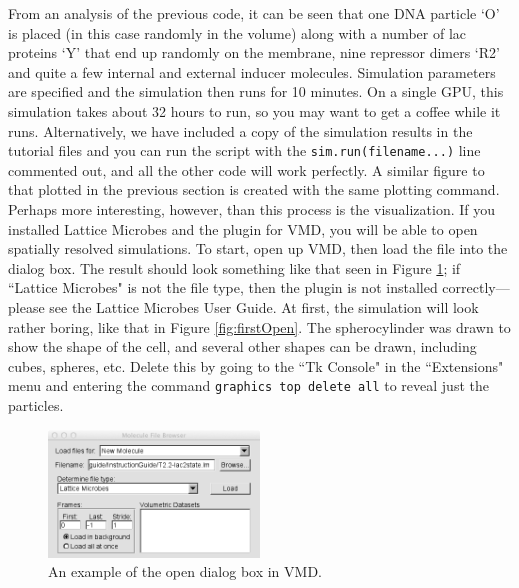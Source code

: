 From an analysis of the previous code, it can be seen that one DNA particle `O' is placed (in this case randomly in the volume) along with a number of lac proteins `Y' that end up randomly on the membrane, nine repressor dimers `R2' and quite a few internal and external inducer molecules. Simulation parameters are specified and the simulation then runs for 10 minutes.  On a single GPU, this simulation takes about 32 hours to run, so you may want to get a coffee while it runs.  Alternatively, we have included a copy of the simulation results in the tutorial files and you can run the script with the \texttt{sim.run(filename...)} line commented out, and all the other code will work perfectly.  A similar figure to that plotted in the previous section is created with the same plotting command. \\

Perhaps more interesting, however, than this process is the visualization.  If you installed Lattice Microbes and the plugin for VMD, you will be able to open spatially resolved simulations.  To start, open up VMD, then load the file into the dialog box.  The result should look something like that seen in Figure \ref{fig:openDiag}; if ``Lattice Microbes" is not the file type, then the plugin is not installed correctly---please see the Lattice Microbes User Guide.  At first, the simulation will look rather boring, like that in Figure \ref{fig:firstOpen}.  The spherocylinder was drawn to show the shape of the cell, and several other shapes can be drawn, including cubes, spheres, etc.  Delete this by going to the ``Tk Console" in the ``Extensions" menu and entering the command \texttt{graphics top delete all} to reveal just the particles. \\

\begin{figure}[h!]
  \centering
        \includegraphics[width=0.5\textwidth]{Figures/openDialog.png}
        \caption{An example of the open dialog box in VMD.} \label{fig:openDiag}
\end{figure}

